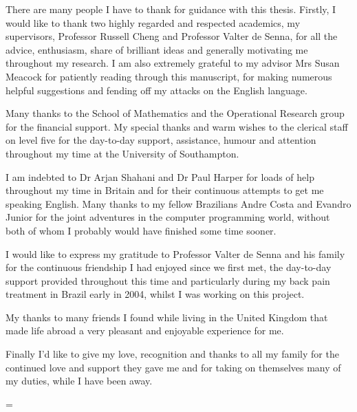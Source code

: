 \begin{thesisacknowledgements}

\parskip=17pt

There are many people I have to thank for guidance with this thesis. Firstly, I would
like to thank two highly regarded and respected academics, my supervisors, Professor
Russell Cheng and Professor Valter de Senna, for all the advice, enthusiasm, share of
brilliant ideas and generally motivating me throughout my research. I am also extremely
grateful to my advisor Mrs Susan Meacock for patiently reading through this manuscript,
for making numerous helpful suggestions and fending off my attacks on the English
language.

Many thanks to the School of Mathematics and the Operational Research group for the
financial support. My special thanks and warm wishes to the clerical staff on level five
for the day-to-day support, assistance, humour and attention throughout my time at the
University of Southampton.

I am indebted to Dr Arjan Shahani and Dr Paul Harper for loads of help throughout my time
in Britain and for their continuous attempts to get me speaking English. Many thanks to
my fellow Brazilians Andre Costa and Evandro Junior for the joint adventures in the
computer programming world, without both of whom I probably would have finished some time
sooner.

I would like to express my gratitude to Professor Valter de Senna and his family for the
continuous friendship I had enjoyed since we first met, the day-to-day support provided
throughout this time and particularly during my back pain treatment in Brazil early in
2004, whilst I was working on this project.

My thanks to many friends I found while living in the United Kingdom that made life
abroad a very pleasant and enjoyable experience for me.


Finally I'd like to give my love, recognition and thanks to all my family for the
continued love and support they gave me and for taking on themselves many of my duties,
while I have been away.

\parskip=\baselineskip
\end{thesisacknowledgements}
